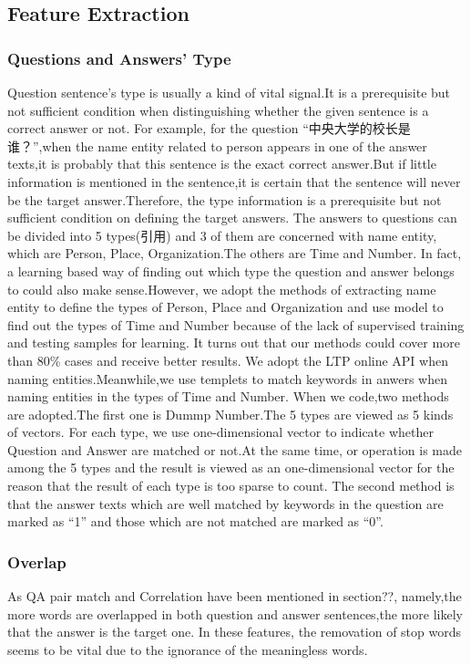\documentclass{llncs}
\begin{document}
\subsection{Feature Extraction}
\subsubsection{Questions and Answers’ Type}
Question sentence’s type is usually a kind of vital signal.It is a prerequisite but not sufficient condition when distinguishing whether the given sentence is a correct answer or not. For example, for the question “中央大学的校长是谁？”,when the name entity related to person appears in one of the answer texts,it is probably that this sentence is the exact correct answer.But if little information is mentioned in the sentence,it is certain that the sentence will never be the target answer.Therefore, the type information is a prerequisite but not sufficient condition on defining the target answers. 
The answers to questions can be divided into 5 types(引用) and 3 of them are concerned with name entity, which are Person, Place, Organization.The others are Time and Number. In fact, a learning based way of finding out which type the question and answer belongs to could also make sense.However, we adopt the methods of extracting name entity to define the types of Person, Place and Organization and use model to find out the types of Time and Number because of the lack of supervised training and testing samples for learning. It turns out that our methods could cover more than 80\% cases and receive better results.
We adopt the LTP online API when naming entities.Meanwhile,we use templets to match keywords in anwers when naming entities in the types of Time and Number.
When we code,two methods are adopted.The first one is Dummp Number.The 5 types are viewed as 5 kinds of vectors. For each type, we use one-dimensional vector to indicate whether Question and Answer are matched or not.At the same time, or operation is made among the 5 types and the result is viewed as an one-dimensional vector for the reason that the result of each type is too sparse to count.
The second method is that the answer texts which are well matched by keywords in the question are marked as “1” and those which are not matched are marked as “0”.


\subsubsection{Overlap}
As QA pair match and Correlation have been mentioned in section??, namely,the more words are overlapped in both question and answer sentences,the more likely that the answer is the target one.
In these features, the removation of stop words seems to be vital due to the ignorance of the meaningless words.
\end{document}
